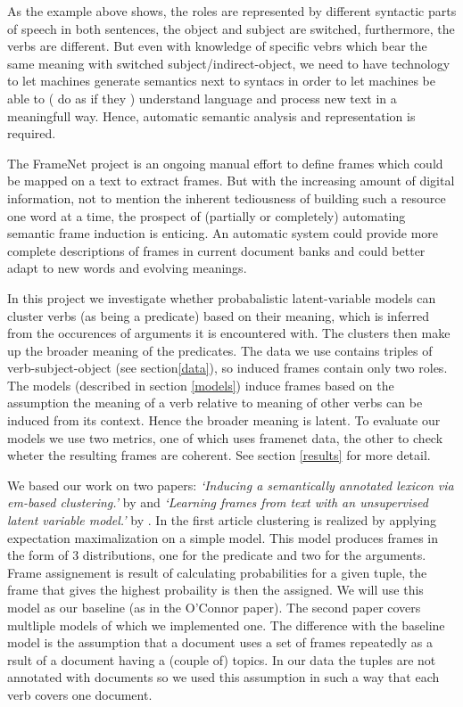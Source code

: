\documentclass{article} %
\begin{document}
As the example above shows, the roles are represented by different syntactic parts of speech in both sentences, the object and subject are switched, furthermore, the verbs are different. But even with knowledge of specific vebrs which bear the same meaning with switched subject/indirect-object, we need to have technology to let machines generate semantics next to syntacs in order to let machines be able to ( do as if they ) understand language and process new text in a meaningfull way. Hence, automatic semantic analysis and representation is required.

The FrameNet project \citep{framenet} is an ongoing manual effort to define frames which could be mapped on a text to extract frames. But with the increasing amount of digital information, not to mention the inherent tediousness of building such a resource one word at a time, the prospect of (partially or completely) automating semantic frame induction is enticing. An automatic system could provide more complete descriptions of frames in current document banks and could better adapt to new words and evolving meanings.

In this project we investigate whether probabalistic latent-variable models can cluster verbs (as being a predicate) based on their meaning, which is inferred from the occurences of arguments it is encountered with. The clusters then make up the broader meaning of the predicates. The data we use contains triples of verb-subject-object (see section\ref{data}), so induced frames contain only two roles. The models (described in section \ref{models}) induce frames based on the assumption the meaning of a verb relative to meaning of other verbs can be induced from its context. Hence the broader meaning is latent. To evaluate our models we use two metrics, one of which uses framenet data, the other to check wheter the resulting frames are coherent. See section \ref{results} for more detail.

We based our work on two papers: \textit{`Inducing a semantically annotated lexicon via em-based clustering.'} by \citeauthor{rooth1999} and \textit{`Learning frames from text with an unsupervised latent variable model.'} by \citeauthor{oconnor2013}. In the first article clustering is realized by applying expectation maximalization on a simple model. This model produces frames in the form of 3 distributions, one for the predicate and two for the arguments. Frame assignement is result of calculating  probabilities for a given tuple, the frame that gives the highest probaility is then the assigned. We will use this model as our baseline (as in the O'Connor paper). The second paper covers multliple models of which we implemented one. The difference with the baseline model is the assumption that a document uses a set of frames repeatedly as a rsult of a document having a (couple of) topics. In our data the tuples are not annotated with documents so we used this assumption in such a way that each verb covers one document.  
\end{document}
